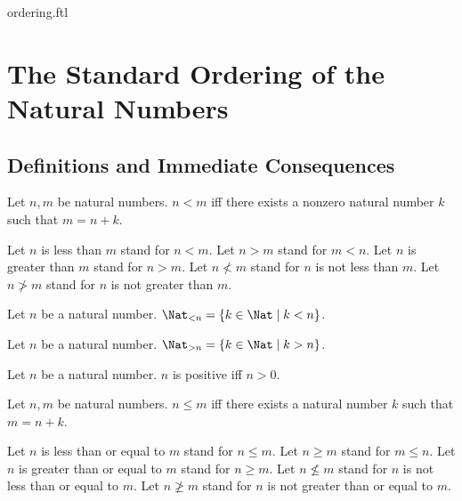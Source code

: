\documentclass{naproche-library}
\begin{document}
\begin{smodule}{ordering.ftl}

  \section*{The Standard Ordering of the Natural Numbers}

  \subsection*{Definitions and Immediate Consequences}

  \begin{definition}[forthel,id=ARITHMETIC_04_1926295512416256]
    Let $n, m$ be natural numbers.
    $n < m$ iff there exists a nonzero natural number $k$ such that $m = n + k$.

    Let $n$ is less than $m$ stand for $n < m$.
    Let $n > m$ stand for $m < n$.
    Let $n$ is greater than $m$ stand for $n > m$.
    Let $n \nless m$ stand for $n$ is not less than $m$.
    Let $n \ngtr m$ stand for $n$ is not greater than $m$.
  \end{definition}

  \begin{definition}[forthel,id=ARITHMETIC_04_3668680374222848]
    Let $n$ be a natural number.
    $\Nat_{< n} = \{ k \in \Nat \mid k < n \}$.
  \end{definition}

  \begin{definition}[forthel,id=ARITHMETIC_04_3670333934534656]
    Let $n$ be a natural number.
    $\Nat_{> n} = \{ k \in \Nat \mid k > n \}$.
  \end{definition}

  \begin{definition}[forthel,id=ARITHMETIC_04_7916616566177792]
    Let $n$ be a natural number.
    $n$ is positive iff $n > 0$.
\end{definition}

  \begin{definition}[forthel,id=ARITHMETIC_04_4593841531256832]
    Let $n, m$ be natural numbers.
    $n \leq m$ iff there exists a natural number $k$ such that $m = n + k$.

    Let $n$ is less than or equal to $m$ stand for $n \leq m$.
    Let $n \geq m$ stand for $m \leq n$.
    Let $n$ is greater than or equal to $m$ stand for $n \geq m$.
    Let $n \nleq m$ stand for $n$ is not less than or equal to $m$.
    Let $n \ngeq m$ stand for $n$ is not greater than or equal to $m$.
  \end{definition}


\end{smodule}
\end{document}

